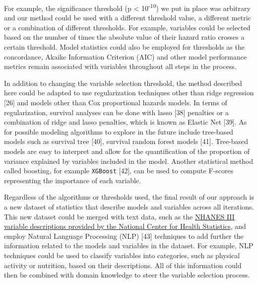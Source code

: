 \documentclass[12pt,oneside]{reedthesis}
\theoremstyle{definition}
\theoremstyle{definition}
\theoremstyle{definition}
\theoremstyle{remark}
\begin{document}
For example, the significance threshold (p \textless{}
10\textsuperscript{-10}) we put in place was arbitrary and our method
could be used with a different threshold value, a different metric or a
combination of different thresholds. For example, variables could be
selected based on the number of times the absolute value of their hazard
ratio crosses a certain threshold. Model statistics could also be
employed for thresholds as the concordance, Akaike Information Criterion
(AIC) and other model performance metrics remain associated with
variables throughout all steps in the process.

In addition to changing the variable selection threshold, the method
described here could be adapted to use regularization techniques other
than ridge regression {[}26{]} and models other than Cox proportional
hazards models. In terms of regularization, survival analyses can be
done with lasso {[}38{]} penalties or a combination of ridge and lasso
penalties, which is known as Elastic Net {[}39{]}. As for possible
modeling algorithms to explore in the future include tree-based models
such as survival tree {[}40{]}, survival random forest models {[}41{]}.
Tree-based models are easy to interpret and allow for the quantification
of the proportion of variance explained by variables included in the
model. Another statistical method called boosting, for example
\texttt{XGBoost} {[}42{]}, can be used to compute F-scores representing
the importance of each variable.

Regardless of the algorithms or thresholds used, the final result of our
approach is a new dataset of statistics that describe models and
variables across all iterations. This new dataset could be merged with
text data, such as the
\href{https://wwwn.cdc.gov/nchs/nhanes/nhanes3/DataFiles.aspx}{NHANES
III variable descriptions provided by the National Center for Health
Statistics}, and employ Natural Language Processing (NLP) {[}43{]}
techniques to add further the information related to the models and
variables in the dataset. For example, NLP techniques could be used to
classify variables into categories, such as physical activity or
nutrition, based on their descriptions. All of this information could
then be combined with domain knowledge to steer the variable selection
process.
\end{document}
